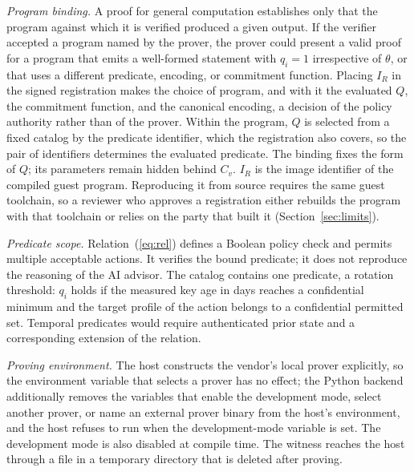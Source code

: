 \documentclass[journal]{IEEEtran}
\begin{document}
\emph{Program binding.} A proof for general computation establishes only that the program against which it is verified produced a given output. If the verifier accepted a program named by the prover, the prover could present a valid proof for a program that emits a well-formed statement with $q_i=1$ irrespective of $\theta$, or that uses a different predicate, encoding, or commitment function. Placing $I_R$ in the signed registration makes the choice of program, and with it the evaluated $Q$, the commitment function, and the canonical encoding, a decision of the policy authority rather than of the prover. Within the program, $Q$ is selected from a fixed catalog by the predicate identifier, which the registration also covers, so the pair of identifiers determines the evaluated predicate. The binding fixes the form of $Q$; its parameters remain hidden behind $C_v$. $I_R$ is the image identifier of the compiled guest program. Reproducing it from source requires the same guest toolchain, so a reviewer who approves a registration either rebuilds the program with that toolchain or relies on the party that built it (Section~\ref{sec:limits}).

\emph{Predicate scope.} Relation~(\ref{eq:rel}) defines a Boolean policy check and permits multiple acceptable actions. It verifies the bound predicate; it does not reproduce the reasoning of the AI advisor. The catalog contains one predicate, a rotation threshold: $q_i$ holds if the measured key age in days reaches a confidential minimum and the target profile of the action belongs to a confidential permitted set. Temporal predicates would require authenticated prior state and a corresponding extension of the relation.

\emph{Proving environment.} The host constructs the vendor's local prover explicitly, so the environment variable that selects a prover has no effect; the Python backend additionally removes the variables that enable the development mode, select another prover, or name an external prover binary from the host's environment, and the host refuses to run when the development-mode variable is set. The development mode is also disabled at compile time. The witness reaches the host through a file in a temporary directory that is deleted after proving.
\end{document}
